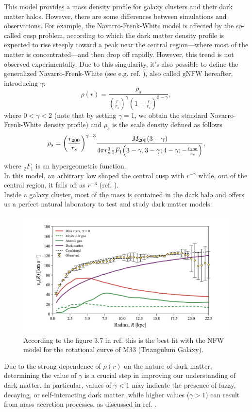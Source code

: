 This model provides a mass density profile for galaxy clusters and their dark matter halos.
However, there are some differences between simulations and observations. For example, the Navarro-Frenk-White model is affected by the so-called cusp problem, according to which the dark matter density profile is expected to rise steeply toward a peak near the central region—where most of the matter is concentrated—and then drop off rapidly. However, this trend is not observed experimentally.
Due to this singularity, it's also possible to define the generalized Navarro-Frenk-White (see e.g. ref. \cite{Wyithe_gNFW_2001}), also called gNFW hereafter, introducing $\gamma$:
\begin{equation}\label{gNFW}
    \rho (r) = \frac{\rho_s}{\left(\frac{r}{r_s}\right)^\gamma \left(1+\frac{r}{r_s}\right)^{3-\gamma}},
\end{equation}
where $0<\gamma<2$ (note that by setting $\gamma = 1$, we obtain the standard Navarro-Frenk-White density profile) and $\rho_s$ is the scale density defined as follows
\begin{equation}
    \rho_s = \qty(\frac{r_{200}}{r_s})^{\gamma-3} \frac{M_{200}(3-\gamma)}{4\pi r_s^3 \, {}_2F_1\qty(3-\gamma, 3-\gamma; 4-\gamma; -\frac{r_{200}}{r_s})},
\end{equation}
where $_2F_1$ is an hypergeometric function.\\
In this model, an arbitrary law shaped the central cusp with $r^{-\gamma}$ while, out of the central region, it falls off as $r^{-3}$ (ref. \cite{Wyithe_gNFW_2001}).\\
Inside a galaxy cluster, most of the mass is contained in the dark halo and offers us a perfect natural laboratory to test and study dark matter models.\\
\begin{figure}[h!]
\centering
    \includegraphics[width=0.682\linewidth]{Images/Chapter2/Rotation curve M33.png}
    \caption[Rotation curve of M33]{According to the figure 3.7 in ref. \cite{2024darkmatter} this is the best fit with the NFW model for the rotational curve of M33 (Triangulum Galaxy).}
\label{rotation speed of galaxy}
\end{figure}
\noindent Due to the strong dependence of $\rho(r)$ on the nature of dark matter, determining the value of $\gamma$ is a crucial step in improving our understanding of dark matter. In particular, values of $\gamma < 1$ may indicate the presence of fuzzy, decaying, or self-interacting dark matter, while higher values ($\gamma > 1$) can result from mass accretion processes, as discussed in ref. \cite{CLASH-VLT:-The-Inner-Slope-of-the-MACS-J1206.2-0847-Dark-Matter-Density-Profile}.\\


